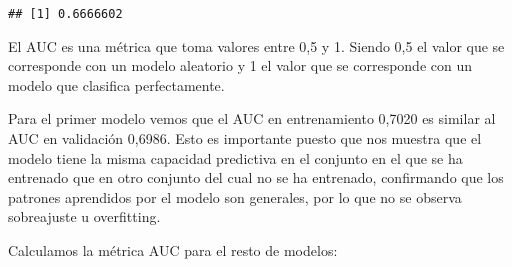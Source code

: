 \documentclass[]{article}
\begin{document}
\begin{verbatim}
## [1] 0.6666602
\end{verbatim}

El AUC es una métrica que toma valores entre 0,5 y 1. Siendo 0,5 el
valor que se corresponde con un modelo aleatorio y 1 el valor que se
corresponde con un modelo que clasifica perfectamente.

Para el primer modelo vemos que el AUC en entrenamiento 0,7020 es
similar al AUC en validación 0,6986. Esto es importante puesto que nos
muestra que el modelo tiene la misma capacidad predictiva en el conjunto
en el que se ha entrenado que en otro conjunto del cual no se ha
entrenado, confirmando que los patrones aprendidos por el modelo son
generales, por lo que no se observa sobreajuste u overfitting.

Calculamos la métrica AUC para el resto de modelos:
\end{document}
